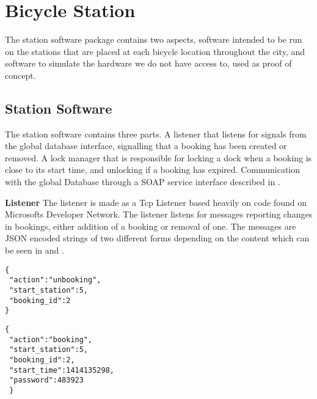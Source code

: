\section{Bicycle Station}
The station software package contains two aspects, software intended to be run on the stations that are placed at each bicycle location throughout the city, and software to simulate the hardware we do not have access to, used as proof of concept.

\subsection{Station Software}
The station software contains three parts.
A listener that listens for signals from the global database interface, signalling that a booking has been created or removed.
A lock manager that is responsible for locking a dock when a booking is close to its start time, and unlocking if a booking has expired.
Communication with the global Database through a SOAP service interface described in .

\textbf{Listener}
The listener is made as a Tcp Listener based heavily on code found on Microsofts Developer Network\citep{misc:TcpListenerSource}. 
The listener listens for messages reporting changes in bookings, either addition of a booking or removal of one. 
The messages are JSON encoded strings of two different forms depending on the content which can be seen in  and .

\begin{minipage}{\textwidth}
\begin{minipage}{0.45\textwidth}
\begin{lstlisting}[caption = {Example of an unbooking message}, label = {lst:JsonUnbooking}]
{
 "action":"unbooking",
 "start_station":5,
 "booking_id":2
}
\end{lstlisting}
\end{minipage}
\hspace{0.5cm}
\begin{minipage}{0.45\textwidth}
\begin{lstlisting}[caption = {Example of a booking message}, label = {lst:JsonBooking}]
{
 "action":"booking",
 "start_station":5,
 "booking_id":2,
 "start_time":1414135298,
 "password":483923
 }
\end{lstlisting}
\end{minipage}
\end{minipage}

